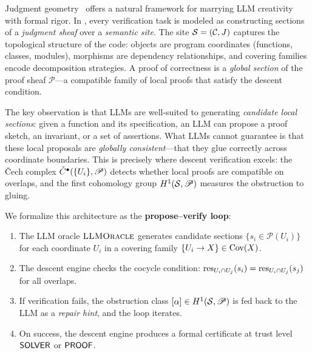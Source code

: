 \documentclass[11pt]{article}
\newcommand{\LLMOracle}{\textsc{LLMOracle}}
\newcommand{\ProofSheaf}{\mathscr{P}}
\begin{document}
Judgment geometry~\cite{JuGeo2024} offers a natural framework for
marrying LLM creativity with formal rigor.  In \JuGeo, every
verification task is modeled as constructing sections of a
\emph{judgment sheaf} over a \emph{semantic site}.  The site
$\mathcal{S} = (\mathcal{C}, J)$ captures the topological structure of the
code: objects are program coordinates (functions, classes, modules),
morphisms are dependency relationships, and covering families encode
decomposition strategies.  A proof of correctness is a
\emph{global section} of the proof sheaf $\ProofSheaf$---a compatible
family of local proofs that satisfy the descent condition.

The key observation is that LLMs are well-suited to generating
\emph{candidate local sections}: given a function and its specification,
an LLM can propose a proof sketch, an invariant, or a set of
assertions.  What LLMs cannot guarantee is that these local proposals
are \emph{globally consistent}---that they glue correctly across
coordinate boundaries.  This is precisely where descent verification
excels: the \v{C}ech complex $\Cech^\bullet(\{U_i\}, \ProofSheaf)$
detects whether local proofs are compatible on overlaps, and the
first cohomology group $\Hcoh{1}(\Site, \ProofSheaf)$ measures the
obstruction to gluing.

We formalize this architecture as the \textbf{propose--verify loop}:
\begin{enumerate}[label=(\roman*)]
  \item The LLM oracle $\LLMOracle$ generates candidate sections
    $\{s_i \in \ProofSheaf(U_i)\}$ for each coordinate $U_i$ in a
    covering family $\{U_i \to X\} \in \mathrm{Cov}(X)$.
  \item The descent engine checks the cocycle condition:
    $\mathrm{res}_{U_i \cap U_j}(s_i) = \mathrm{res}_{U_i \cap U_j}(s_j)$ for all
    overlaps.
  \item If verification fails, the obstruction class
    $[\alpha] \in \Hcoh{1}(\Site, \ProofSheaf)$ is fed back to the LLM
    as a \emph{repair hint}, and the loop iterates.
  \item On success, the descent engine produces a formal certificate
    at trust level $\mathsf{SOLVER}$ or $\mathsf{PROOF}$.
\end{enumerate}
\end{document}
